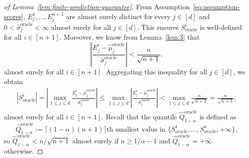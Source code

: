 \begin{proof}[of Lemma~\ref{lem:finite-prediction-guarantee}]
From Assumption~\ref{eq:assumption-scores}, $E^1_j,\dots, E^{n+1}_j$ are almost surely distinct for every $j \in [d]$ and $0<\hat{\sigma}^{\mathrm{oracle}}_j < \infty$ almost surely for all $j \in [d]$. This ensures $S_{\mathrm{oracle}}^i$ is well-defined for all $i \in [n+1]$. Moreover, we know from Lemma~\ref{lem:3} that
\[
\left|\frac{E^i_j - \hat{\mu}^{\mathrm{oracle}}_j}{\hat{\sigma}^{\mathrm{oracle}}_j}\right| < \frac{n}{\sqrt{n+1}},
\]
almost surely for all $i \in [n+1]$. Aggregating this inequality for all $j \in [d]$, we obtain
\begin{align*}
    |S_{\mathrm{oracle}}^i| = \left|\max_{1\leq j\leq d}\frac{E^i_j - \hat{\mu}^{\mathrm{oracle}}_j}{\hat{\sigma}^{\mathrm{oracle}}_j}\right|\leq \max_{1\leq j\leq d}\left|\frac{E^i_j - \hat{\mu}^{\mathrm{oracle}}_j}{\hat{\sigma}^{\mathrm{oracle}}_j}\right|< \max_{1\leq j\leq d}\frac{n}{\sqrt{n+1}}=\frac{n}{\sqrt{n+1}},
\end{align*}
almost surely for all $i \in [n+1]$. Recall that the quantile $\hat{Q}^{\mathrm{oracle}}_{1-\alpha}$ is defined as
\[
\hat{Q}^{\mathrm{oracle}}_{1-\alpha}:= \lceil(1-\alpha)(n+1)\rceil\text{th smallest value in } \{S_{\mathrm{oracle}}^1,\dots, S_{\mathrm{oracle}}^n, +\infty\},
\]
so $\hat{Q}^{\mathrm{oracle}}_{1-\alpha} < n/\sqrt{n+1}$ almost surely if $n \geq 1/\alpha-1$ and $\hat{Q}^{\mathrm{oracle}}_{1-\alpha} = +\infty$ otherwise.
\end{proof}


